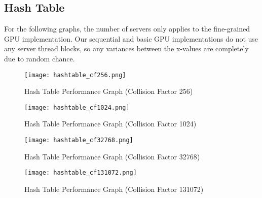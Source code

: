 \documentclass{article}
\begin{document}
\subsection{Hash Table}

For the following graphs, the number of servers only applies to the fine-grained
GPU implementation. Our sequential and basic GPU implementations do not use any 
server thread blocks, so any variances between the x-values are completely due 
to random chance. 

\begin{figure}[H]
    \centering
    \texttt{[image: hashtable\_cf256.png]}
    \caption{Hash Table Performance Graph (Collision Factor 256)}
\end{figure}

\begin{figure}[H]
    \centering
    \texttt{[image: hashtable\_cf1024.png]}
    \caption{Hash Table Performance Graph (Collision Factor 1024)}
\end{figure}

\begin{figure}[H]
    \centering
    \texttt{[image: hashtable\_cf32768.png]}
    \caption{Hash Table Performance Graph (Collision Factor 32768)}
\end{figure}

\begin{figure}[H]
    \centering
    \texttt{[image: hashtable\_cf131072.png]}
    \caption{Hash Table Performance Graph (Collision Factor 131072)}
\end{figure}
\end{document}
